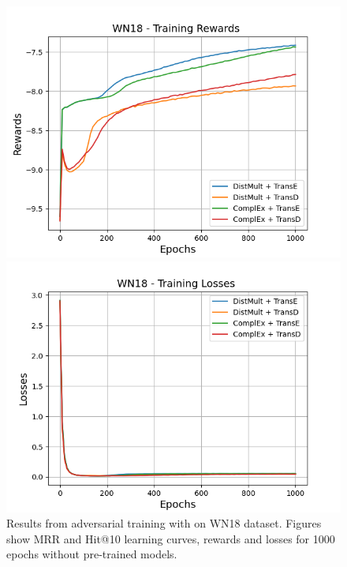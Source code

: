 \begin{figure}
    \begin{minipage}{.5\textwidth}
      \centering
      \includegraphics[width=\linewidth]{figures/results/gan_train/not_pretrained/random/wn18/epochs1000/random_wn18_rew.png}
    \end{minipage}%
     \begin{minipage}{.5\textwidth}
      \centering
      \includegraphics[width=\linewidth]{figures/results/gan_train/not_pretrained/random/wn18/epochs1000/random_wn18_losses.png}
    \end{minipage}%
    \caption{Results from adversarial training with \origsampling on \textsc{WN18} dataset.
    Figures show MRR and Hit@10 learning curves, rewards and losses for 1000 epochs without pre-trained models.}
    \label{fig:gan_train_not_pretrained_random_wn18}
\end{figure}
